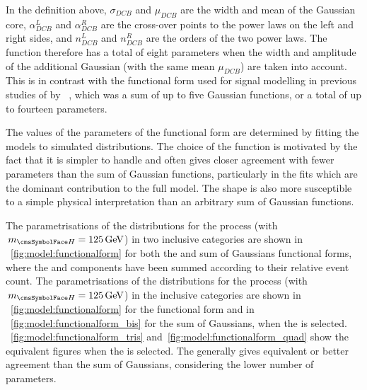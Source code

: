 In the definition above, $\sigma_{DCB}$ and $\mu_{DCB}$ are the width and mean of the Gaussian core, $\alpha_{DCB}^{L}$ and $\alpha_{DCB}^{R}$ are the cross-over points to the power laws on the left and right sides, and $n_{DCB}^{L}$ and $n_{DCB}^{R}$ are the orders of the two power laws. The \DCBpG function therefore has a total of eight parameters when the width and amplitude of the additional Gaussian (with the same mean $\mu_{DCB}$) are taken into account. This is in contrast with the functional form used for signal modelling in previous studies of \Hgg by \CMS~\cite{LegacyHgg,CMS-PAS-HIG-15-005,CMS-PAS-HIG-16-020}, which was a sum of up to five Gaussian functions, or a total of up to fourteen parameters.

The values of the parameters of the functional form are determined by fitting the models to simulated \mgg distributions. 
The choice of the \DCBpG function is motivated by the fact that it is simpler to handle and often gives closer agreement with fewer parameters than the sum of Gaussian functions, particularly in the \RV fits which are the dominant contribution to the full model. 
The \DCB shape is also more susceptible to a simple physical interpretation than an arbitrary sum of Gaussian functions. 

\ifNewAnalysis
The parametrisations of the \mgg distributions for the \ggH process (with $\mH=125\GeV$) in two inclusive categories are shown in \Fig~\ref{fig:model:functionalform} for both the \DCBpG and sum of Gaussians functional forms, where the \RV and \WV components have been summed according to their relative event count. %
\else
The parametrisations of the \mgg distributions for the \ggH process (with $\mH=125\GeV$) in the inclusive categories are shown in \Fig~\ref{fig:model:functionalform} for the \DCBpG functional form and in \Fig~\ref{fig:model:functionalform_bis} for the sum of Gaussians, when the \RV is selected. \Fig\s~\ref{fig:model:functionalform_tris} and~\ref{fig:model:functionalform_quad} show the equivalent figures when the \WV is selected.
\fi
The \DCBpG generally gives equivalent or better agreement than the sum of Gaussians, considering the lower number of parameters. 

